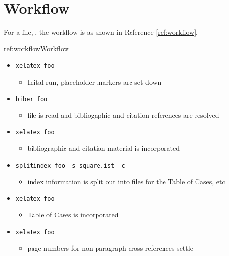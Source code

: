 \section{Workflow}\label{workflow}
\p For a file, , the workflow is as shown in Reference \ref{ref:workflow}.

\begin{dor}{ref:workflow}{Workflow}
\begin{itemize}
\item \verb|xelatex foo|
	\begin{itemize}
	\item Inital run, placeholder markers are set down
	\end{itemize}
\item \verb|biber foo|
	\begin{itemize}
	\item {} file is read and bibliogaphic and citation references are resolved
	\end{itemize}
\item \verb|xelatex foo|
	\begin{itemize}
	\item bibliographic and citation material is incorporated
	\end{itemize}
\item \verb|splitindex foo -s square.ist -c|
	\begin{itemize}
	\item index information is split out into  files for the Table of Cases, etc
	\end{itemize}
\item \verb|xelatex foo|
	\begin{itemize}
	\item Table of Cases is incorporated
	\end{itemize}
\item \verb|xelatex foo|
	\begin{itemize}
	\item page numbers for non-paragraph cross-references settle
	\end{itemize}
\end{itemize}
\end{dor}

